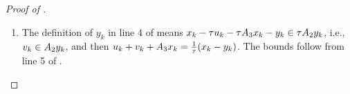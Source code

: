 \documentclass[11pt]{article}
\makeatletter
\newif\ifautonum@forceNumbers
\def\label{\@ifnextchar[\autonum@subeq@label@opt\autonum@subeq@label@noopt}%
\def\autonum@subeq@label@noopt#1{\autonum@subeq@check{#1}\autonum@subeq@origLabel{#1}}
\def\autonum@subeq@label@opt[#1]#2{\autonum@subeq@check{#2}\autonum@subeq@origLabel[#1]{#2}}
\def\autonum@subeq@check#1{\ifdefstring{\@currenvir}{subequations}{\ifcsedef{autonum@#1Referenced}{\autonum@forceNumberstrue}{}}{}}
\makeatother
\begin{document}
\begin{proof}[Proof of ]
\begin{enumerate}
\begin{align}
                &= \theta\tau\left( \frac{\sqrt{L_3}}{2}\norm{\bar d} - \frac{\norm{\Delta\Acal_3}}{\sqrt{L_3}} \right)^2\\
                &\geq 0,
            \end{align}
            so $\Bcal$ is monotone.
            For maximality, fix $w$ and set $x_1 = J_{\tau\Acal_1}(w)$, $\tau u = w - x_1\in\tau\Acal_1 x_1$.
            By item 2, this yields a graph pair with $\zeta + \Ccal^*(x_1,x_2,v) = w$, so $\range(I+\Bcal) = \Hcal$ and $\Bcal$ is maximal monotone by Minty's theorem \citep[Theorem 21.1]{bauschkeConvexAnalysisMonotone2017}.
            The same graph pair gives $J(w) = \Ccal^*(x_1,x_2,v) = w - \zeta = w - \theta(x_1 - x_2)$ with $x_2 = J_{\tau\Acal_2}(x_1 - \tau u - \tau\Acal_3 x_1) = J_{\tau\Acal_2}(2x_1 - w - \tau\Acal_3 x_1)$.
        \item The definition of $y_k$ in line 4 of  means $x_k - \tau u_k - \tau{A}_3 x_k - y_k\in\tau{A}_2 y_k$, i.e., $v_k\in{A}_2 y_k$, and then $u_k + v_k + {A}_3 x_k = \frac{1}{\tau}(x_k - y_k)$.
            The bounds follow from line 5 of .
    \end{enumerate}
\end{proof}


\end{document}
